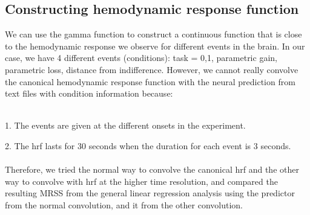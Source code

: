 \subsection{Constructing hemodynamic response function}
We can use the gamma function to construct a continuous function that is close to 
the hemodynamic response we observe for different events in the brain. In our case,
we have 4 different events (conditions): task = {0,1}, parametric gain, parametric loss, distance 
from indifference. However, we cannot really convolve the canonical hemodynamic response function with the neural prediction from text files with condition information because:\\
\\
\par 1. The events are given at the different onsets in the experiment.\\
\par 2. The hrf lasts for 30 seconds when the duration for each event is 3 seconds.\\
\\
Therefore, we tried the normal way to convolve the canonical hrf and the other way to convolve with hrf at the higher time resolution, and compared the resulting MRSS from the general linear regression analysis using the predictor from the normal convolution, and it from the other convolution.\\ 


